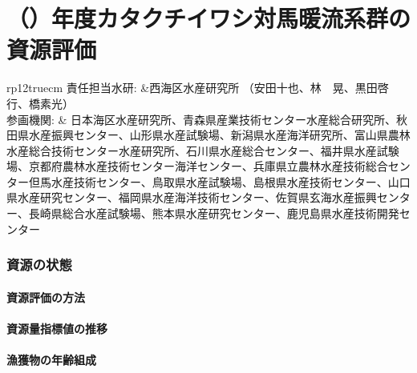 \chapter{\thisyrjp（\thisyrad）年度カタクチイワシ対馬暖流系群の資源評価}

\begin{table}[h]
\begin{tabular}{{rp{12truecm}}}
責任担当水研: &西海区水産研究所 （安田十也、林　晃、黒田啓行、橋素光）\\
参画機関: & 日本海区水産研究所、青森県産業技術センター水産総合研究所、秋田県水産振興センター、山形県水産試験場、新潟県水産海洋研究所、富山県農林水産総合技術センター水産研究所、石川県水産総合センター、福井県水産試験場、京都府農林水産技術センター海洋センター、兵庫県立農林水産技術総合センター但馬水産技術センター、鳥取県水産試験場、島根県水産技術センター、山口県水産研究センター、福岡県水産海洋技術センター、佐賀県玄海水産振興センター、長崎県総合水産試験場、熊本県水産研究センター、鹿児島県水産技術開発センター
\end{tabular}
\end{table}






\subsection{資源の状態}
\subsubsection{資源評価の方法}
\subsubsection{資源量指標値の推移}
\subsubsection{漁獲物の年齢組成}
